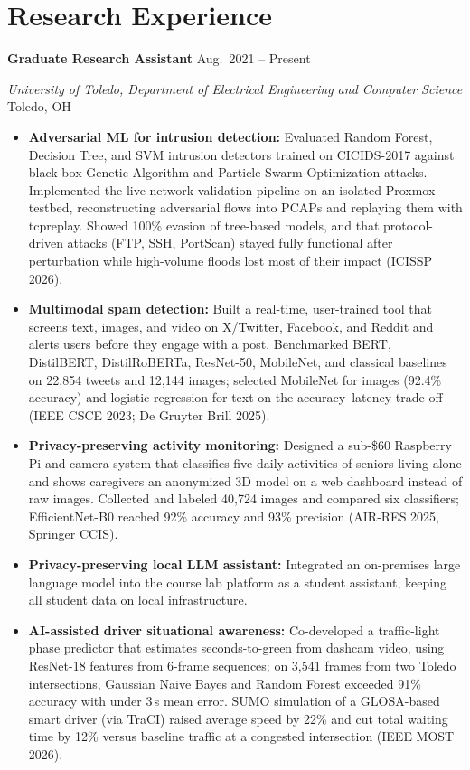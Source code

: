 \documentclass[11pt,letterpaper]{article}
\newcommand{\entry}[4]{%
  \textbf{#1} \hfill #2\par
  \textit{#3} \hfill #4\par\vspace{1pt}}
\begin{document}
\section{Research Experience}
\entry{Graduate Research Assistant}{Aug.\ 2021 -- Present}
      {University of Toledo, Department of Electrical Engineering and Computer Science}{Toledo, OH}
\begin{itemize}
  \item \textbf{Adversarial ML for intrusion detection:} Evaluated Random Forest,
        Decision Tree, and SVM intrusion detectors trained on CICIDS-2017 against
        black-box Genetic Algorithm and Particle Swarm Optimization attacks.
        Implemented the live-network validation pipeline on an isolated Proxmox testbed,
        reconstructing adversarial flows into PCAPs and replaying them with tcpreplay.
        Showed 100\% evasion of tree-based models, and that protocol-driven attacks
        (FTP, SSH, PortScan) stayed fully functional after perturbation while
        high-volume floods lost most of their impact (ICISSP 2026).
  \item \textbf{Multimodal spam detection:} Built a real-time, user-trained tool that
        screens text, images, and video on X/Twitter, Facebook, and Reddit and alerts
        users before they engage with a post. Benchmarked BERT, DistilBERT,
        DistilRoBERTa, ResNet-50, MobileNet, and classical baselines on 22,854 tweets
        and 12,144 images; selected MobileNet for images (92.4\% accuracy) and logistic
        regression for text on the accuracy--latency trade-off (IEEE CSCE 2023;
        De Gruyter Brill 2025).
  \item \textbf{Privacy-preserving activity monitoring:} Designed a sub-\$60 Raspberry Pi
        and camera system that classifies five daily activities of seniors living alone
        and shows caregivers an anonymized 3D model on a web dashboard instead of raw
        images. Collected and labeled 40,724 images and compared six classifiers;
        EfficientNet-B0 reached 92\% accuracy and 93\% precision (AIR-RES 2025,
        Springer CCIS).
  \item \textbf{Privacy-preserving local LLM assistant:} Integrated an on-premises large
        language model into the course lab platform as a student assistant, keeping
        all student data on local infrastructure.
  \item \textbf{AI-assisted driver situational awareness:} Co-developed a traffic-light phase
        predictor that estimates seconds-to-green from dashcam video, using ResNet-18
        features from 6-frame sequences; on 3,541 frames from two Toledo intersections,
        Gaussian Naive Bayes and Random Forest exceeded 91\% accuracy with under 3\,s
        mean error. SUMO simulation of a GLOSA-based smart driver (via TraCI) raised
        average speed by 22\% and cut total waiting time by 12\% versus baseline
        traffic at a congested intersection (IEEE MOST 2026).
\end{itemize}
\end{document}
